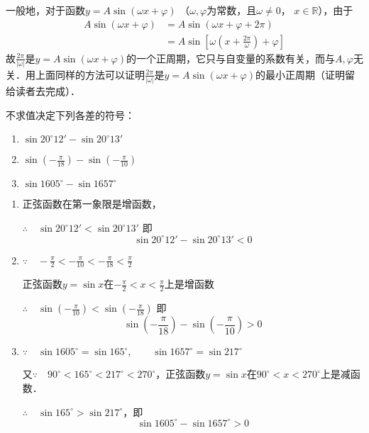 一般地，对于函数$y=A\sin(\omega x+\varphi)$ （$\omega,\varphi$为常数，且$\omega\ne 0$， $x\in\mathbb{R}$），由于
\[\begin{split}
    A\sin(\omega x+\varphi)&=A\sin(\omega x+\varphi+2\pi)\\
    &=A\sin\left[\omega\left(x+\frac{2\pi}{\omega}\right)+\varphi\right]  
\end{split}\]
故$\frac{2\pi}{|\omega|}$是$y=A\sin(\omega x+\varphi)$的一个正周期，它只与自变量的系数有关，而与$A,\varphi$无关．用上面同样的方法可以证明$\frac{2\pi}{|\omega|}$是$y=A\sin(\omega x+\varphi)$的最小正周期（证明留给读者去完成）．

\begin{example}
不求值决定下列各差的符号：
\begin{enumerate}
    \item $\sin 20^{\circ}12'-\sin20^{\circ}13'$
    \item $\sin\left(-\frac{\pi}{18}\right)-\sin\left(-\frac{\pi}{10}\right)$
    \item $ \sin1605^{\circ}-\sin1657^{\circ}$
\end{enumerate}  
\end{example}

\begin{solution}
\begin{enumerate}
    \item 正弦函数在第一象限是增函数，
    
$\therefore\quad  \sin 20^{\circ}12'<\sin20^{\circ}13'$
即
    \[\sin 20^{\circ}12'-\sin20^{\circ}13'<0\]
\item $\because\quad -\frac{\pi}{2}<-\frac{\pi}{10}<-\frac{\pi}{18}<\frac{\pi}{2}$

正弦函数$y=\sin x$在$-\frac{\pi}{2}<x<\frac{\pi}{2}$上是增函数

$\therefore\quad \sin\left(-\frac{\pi}{10}\right)<\sin\left(-\frac{\pi}{18}\right)$
即
\[\sin\left(-\frac{\pi}{18}\right)-\sin\left(-\frac{\pi}{10}\right)>0\]

\item $\because\quad \sin 1605^{\circ}=\sin 165^{\circ},\qquad \sin 1657^{\circ}=\sin 217^{\circ}$

又$\because\quad 90^{\circ}<165^{\circ}<217^{\circ}<270^{\circ}$，正弦函数$y=\sin x$在$90^{\circ}<x<270^{\circ}$上是减函数．

$\therefore\quad \sin 165^{\circ}>\sin 217^{\circ}$，即
\[\sin 1605^{\circ}-\sin 1657^{\circ}>0\]
\end{enumerate}
\end{solution}

